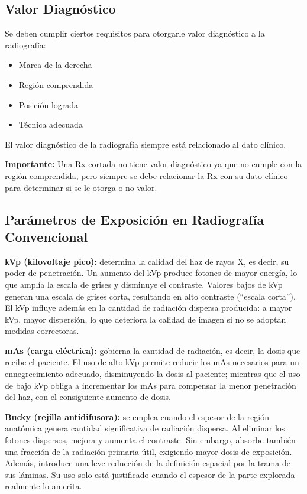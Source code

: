 	\subsection{Valor Diagnóstico}
	
	Se deben cumplir ciertos requisitos para otorgarle valor diagnóstico a la radiografía:
	\begin{itemize}
		\item Marca de la derecha
		\item Región comprendida
		\item Posición lograda
		\item Técnica adecuada
	\end{itemize}
	
	El valor diagnóstico de la radiografía siempre está relacionado al dato clínico.
	
	\textbf{Importante:} Una Rx cortada no tiene valor diagnóstico ya que no cumple con la región comprendida, pero siempre se debe relacionar la Rx con su dato clínico para determinar si se le otorga o no valor.
	
	\subsection{Parámetros de Exposición en Radiografía Convencional}
	
	\textbf{kVp (kilovoltaje pico):} determina la calidad del haz de rayos X, es decir, su poder de penetración. Un aumento del kVp produce fotones de mayor energía, lo que amplía la escala de grises y disminuye el contraste. Valores bajos de kVp generan una escala de grises corta, resultando en alto contraste (``escala corta''). El kVp influye además en la cantidad de radiación dispersa producida: a mayor kVp, mayor dispersión, lo que deteriora la calidad de imagen si no se adoptan medidas correctoras.
	
	\textbf{mAs (carga eléctrica):} gobierna la cantidad de radiación, es decir, la dosis que recibe el paciente. El uso de alto kVp permite reducir los mAs necesarios para un ennegrecimiento adecuado, disminuyendo la dosis al paciente; mientras que el uso de bajo kVp obliga a incrementar los mAs para compensar la menor penetración del haz, con el consiguiente aumento de dosis.
	
	\textbf{Bucky (rejilla antidifusora):} se emplea cuando el espesor de la región anatómica genera cantidad significativa de radiación dispersa. Al eliminar los fotones dispersos, mejora y aumenta el contraste. Sin embargo, absorbe también una fracción de la radiación primaria útil, exigiendo mayor dosis de exposición. Además, introduce una leve reducción de la definición espacial por la trama de sus láminas. Su uso solo está justificado cuando el espesor de la parte explorada realmente lo amerita.
	

